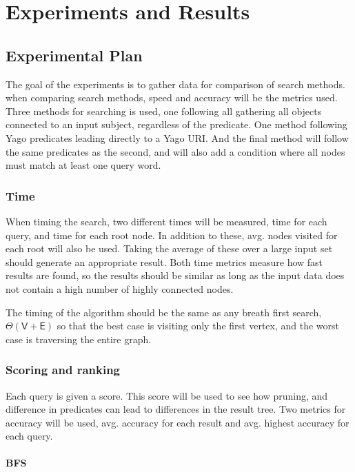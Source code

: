 \chapter{Experiments and Results}
\label{cha:Experiments}

\section{Experimental Plan}
\label{sec:experimentalPlan}
The goal of the experiments is to gather data for comparison of search methods. when comparing search methods, speed and accuracy will be the metrics used. Three methods for searching is used, one following all gathering all objects connected to an input subject, regardless of the predicate. One method following Yago predicates leading directly to a Yago URI. And the final method will follow the same predicates as the second, and will also add a condition where all nodes must match at least one query word.

\subsection{Time}
When timing the search, two different times will be measured, time for each query, and time for each root node. In addition to these, avg. nodes visited for each root will also be used. Taking the average of these over a large input set should generate an appropriate result. Both time metrics measure how fast results are found, so the results should be similar as long as the input data does not contain a high number of highly connected nodes.

The timing of the algorithm should be the same as any breath first search, $\Theta(\mathsf{V} + \mathsf{E})$ so that the best case is visiting only the first vertex, and the worst case is traversing the entire graph.


\subsection{Scoring and ranking}
Each query is given a score. This score will be used to see how pruning, and difference in predicates can lead to differences in the result tree. Two metrics for accuracy will be used, avg. accuracy for each result and avg. highest accuracy for each query.

\subsubsection{BFS}

